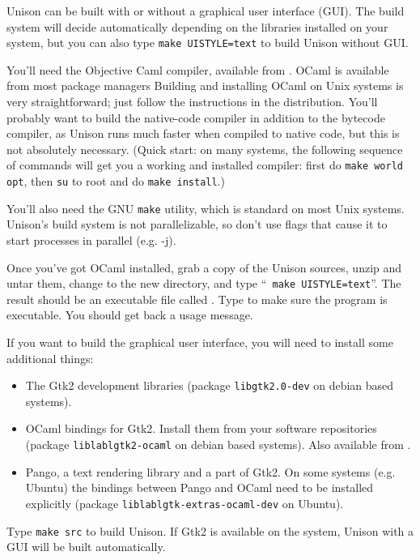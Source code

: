 \documentclass{article}
\begin{document}

Unison can be built with or without a graphical user interface (GUI). The
build system will decide automatically depending on the libraries installed
on your system, but you can also type {\tt make UISTYLE=text} to build
Unison without GUI.

You'll need the Objective Caml compiler,
available from .  OCaml is available from most
package managers
Building and installing OCaml
on Unix systems is very straightforward; just follow the instructions in the
distribution.  You'll probably want to build the native-code compiler in
addition to the bytecode compiler, as Unison runs much faster when compiled
to native code, but this is not absolutely necessary.
%
(Quick start: on many systems, the following sequence of commands will
get you a working and installed compiler: first do {\tt make world opt},
then {\tt su} to root and do {\tt make install}.)

You'll also need the GNU {\tt make} utility, which is standard on most Unix
systems.  Unison's build system is not parallelizable, so don't use flags
that cause it to start processes in parallel (e.g. -j).

Once you've got OCaml installed, grab a copy of the Unison sources, unzip
and untar them, change to the new  directory, and type ``{\tt
  make UISTYLE=text}''.  The result should be an executable file called
.  Type  to make sure the program is
executable.  You should get back a usage message.

If you want to build the graphical user interface, you will need to install
some additional things:
\begin{itemize}
\item The Gtk2 development libraries (package {\tt libgtk2.0-dev} on debian
based systems).
\item OCaml bindings for Gtk2. Install them from your software repositories
(package {\tt liblablgtk2-ocaml} on debian based systems). Also available
from .
\item Pango, a text rendering library and a part of Gtk2. On some systems
(e.g. Ubuntu) the bindings between Pango and OCaml need to be installed
explicitly (package {\tt liblablgtk-extras-ocaml-dev} on Ubuntu).
\end{itemize}
Type {\tt make src} to build Unison. If Gtk2 is available on the system,
Unison with a GUI will be built automatically.
\end{document}
